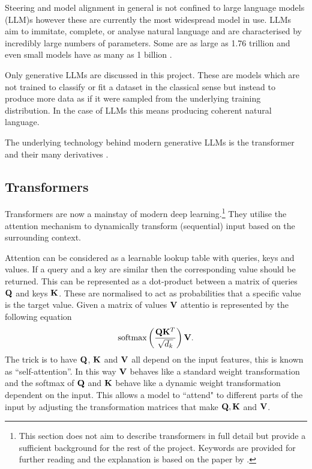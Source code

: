 Steering and model alignment in general is not confined to large language models (LLM)s however these are currently the most widespread model in use.
LLMs aim to immitate, complete, or analyse natural language and are characterised by incredibly large numbers of parameters.
Some are as large as 1.76 trillion \citep{gpt4-count} and even small models have as many as 1 billion \citep{gemma}.

Only generative LLMs are discussed in this project.
These are models which are not trained to classify or fit a dataset in the classical sense but instead to produce more data as if it were sampled from the underlying training distribution.
In the case of LLMs this means producing coherent natural language.

The underlying technology behind modern generative LLMs is the transformer \citep{transformers} and their many derivatives \citep{linear-attention, bigbird, linformer}.

\subsection{Transformers}

Transformers \citep{transformers} are now a mainstay of modern deep learning.\footnote{This section does not aim to describe transformers in full detail but provide a sufficient background for the rest of the project.
Keywords are provided for further reading and the explanation is based on the paper by \citet{turner2023}.}
They utilise the attention mechanism to dynamically transform (sequential) input based on the surrounding context.

Attention can be considered as a learnable lookup table with queries, keys and values.
If a query and a key are similar then the corresponding value should be returned.
This can be represented as a dot-product between a matrix of queries $\mathbf{Q}$ and keys $\mathbf{K}$.
These are normalised to act as probabilities that a specific value is the target value.
Given a matrix of values $\mathbf{V}$ attentio is represented by the following equation
\begin{equation*}
    \text{softmax}\left(\frac{\mathbf{Q}\mathbf{K}^T}{\sqrt{d_k}}\right)\mathbf{V}.
\end{equation*}
The trick is to have $\mathbf{Q}$, $\mathbf{K}$ and $\mathbf{V}$ all depend on the input features, this is known as ``self-attention''.
In this way $\mathbf{V}$ behaves like a standard weight transformation and the softmax of $\mathbf{Q}$ and $\mathbf{K}$ behave like a dynamic weight transformation dependent on the input.
This allows a model to ``attend" to different parts of the input by adjusting the transformation matrices that make $\mathbf{Q}, \mathbf{K}$ and $\mathbf{V}$.

